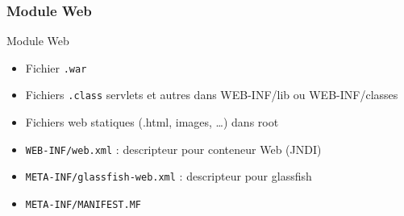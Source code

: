 \documentclass[english, french]{beamer}
\begin{document}
\begin{frame}
	\frametitle{Module Web}
	\begin{block}{Module Web}
		\begin{itemize}
			\item Fichier \texttt{.war}
			\item Fichiers \texttt{.class} servlets et autres dans WEB-INF/lib ou WEB-INF/classes
			\item Fichiers web statiques (.html, images, …) dans root
			\item \texttt{WEB-INF/web.xml} : descripteur pour conteneur Web (JNDI)
			\item \texttt{META-INF/glassfish-web.xml} : descripteur pour glassfish
			\item \texttt{META-INF/MANIFEST.MF}
		\end{itemize}
	\end{block}
\end{frame}
\end{document}
